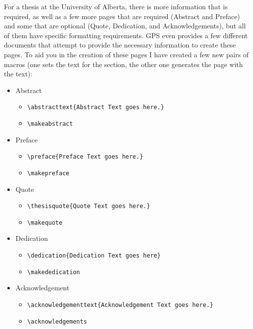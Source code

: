 		For a thesis at the University of Alberta, there is more information that is required, as well as a few more pages that are required (Abstract and Preface) and some that are optional (Quote, Dedication, and Acknowledgements), but all of them have specific formatting requirements.
		GPS even provides a few different documents that attempt to provide the necessary information to create these pages\cite{FGPS2024}.
		To aid you in the creation of these pages I have created a few new pairs of macros (one sets the text for the section, the other one generates the page with the text):
		\begin{itemize}
			\item Abstract
				\begin{itemize}
					\item \lstinline|\abstracttext{Abstract Text goes here.}|
					\item \lstinline|\makeabstract|
				\end{itemize}
			\item Preface
				\begin{itemize}
					\item \lstinline|\preface{Preface Text goes here.}|
					\item \lstinline|\makepreface|
				\end{itemize}
			\item Quote
				\begin{itemize}
					\item \lstinline|\thesisquote{Quote Text goes here.}|
					\item \lstinline|\makequote|
				\end{itemize}
			\item Dedication
				\begin{itemize}
					\item \lstinline|\dedication{Dedication Text goes here}|
					\item \lstinline|\makededication|
				\end{itemize}
			\item Acknowledgement
				\begin{itemize}
					\item \lstinline|\acknowledgementtext{Acknowledgement Text goes here.}|
					\item \lstinline|\acknowledgements|
				\end{itemize}
		\end{itemize}


